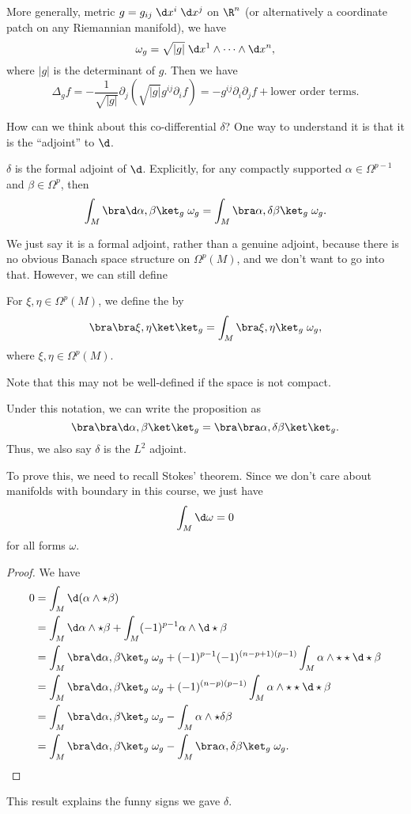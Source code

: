 \documentclass[a4paper]{article}
\begin{document}
More generally, metric $g = g_{ij}\; \d x^i\; \d x^j$ on $\R^n$ (or alternatively a coordinate patch on any Riemannian manifold), we have
\[
  \omega_g = \sqrt{|g|}\;\d x^1 \wedge \cdots \wedge \d x^n,
\]
where $|g|$ is the determinant of $g$. Then we have
\[
  \Delta_g f = -\frac{1}{\sqrt{|g|}} \partial_j (\sqrt{|g|} g^{ij} \partial_i f) = - g^{ij} \partial_i \partial_j f + \text{lower order terms}.
\]

How can we think about this co-differential $\delta$? One way to understand it is that it is the ``adjoint'' to $\d$.

\begin{prop}
  $\delta$ is the formal adjoint of $\d$. Explicitly, for any compactly supported $\alpha \in \Omega^{p - 1}$ and $\beta \in \Omega^p$, then
  \[
    \int_M \bra \d \alpha, \beta\ket_g\;\omega_g = \int_M \bra \alpha, \delta \beta\ket_g\;\omega_g.
  \]
\end{prop}
We just say it is a formal adjoint, rather than a genuine adjoint, because there is no obvious Banach space structure on $\Omega^p(M)$, and we don't want to go into that. However, we can still define

\begin{defi}
  For $\xi, \eta \in \Omega^p(M)$, we define the  by
  \[
    \bra \bra \xi, \eta\ket\ket_g = \int_M \bra \xi, \eta\ket_g\;\omega_g,
  \]
  where $\xi, \eta \in \Omega^p(M)$.
\end{defi}
Note that this may not be well-defined if the space is not compact.

Under this notation, we can write the proposition as
\[
  \bra\bra \d \alpha, \beta\ket\ket_g = \bra \bra \alpha, \delta \beta \ket\ket_g.
\]
Thus, we also say $\delta$ is the $L^2$ adjoint.

To prove this, we need to recall Stokes' theorem. Since we don't care about manifolds with boundary in this course, we just have
\[
  \int_M \d \omega = 0
\]
for all forms $\omega$.
\begin{proof}
  We have
  \begin{align*}
    0 &= \int_M \d (\alpha \wedge \star\beta)\\
    &= \int_M \d \alpha \wedge \star\beta + \int_M (-1)^{p - 1} \alpha \wedge \d \star \beta\\
    &= \int_M \bra \d \alpha, \beta \ket_g\;\omega_g + (-1)^{p - 1} (-1)^{(n - p + 1)(p - 1)}\int_M \alpha \wedge \star\star\d\star \beta\\
    &= \int_M \bra \d \alpha, \beta \ket_g\;\omega_g + (-1)^{(n - p)(p - 1)} \int_M \alpha \wedge \star\star\d\star \beta\\
    &= \int_M \bra \d \alpha, \beta\ket_g\;\omega_g - \int_M \alpha \wedge \star \delta \beta\\
    &= \int_M \bra \d \alpha, \beta\ket_g\;\omega_g - \int_M \bra \alpha, \delta \beta\ket_g\;\omega_g.
  \end{align*}
\end{proof}
This result explains the funny signs we gave $\delta$.
\end{document}

